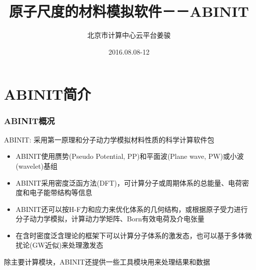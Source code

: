 \documentclass[cjk,slidestop,compress,mathserif,blue]{beamer}
\begin{document}

\title{原子尺度的材料模拟软件－－ABINIT}

\author{北京市计算中心\;云平台\:姜骏}
\date{\textrm{2016.08.08-12}}
\frame{\titlepage}

\section*{}

\small
\section{ABINIT简介}
\frame
{
\frametitle{ABINIT概况}
\textrm{ABINIT}: 采用第一原理和分子动力学模拟材料性质的科学计算软件包
\begin{itemize}
	\item \textrm{ABINIT}使用赝势\textrm{(Pseudo Potential, PP)}和平面波\textrm{(Plane wave, PW)}或小波\textrm{(wavelet)}基组
	\item \textrm{ABINIT}采用密度泛函方法\textrm{(DFT)}，可计算分子或周期体系的总能量、电荷密度和电子能带结构等信息
	\item \textrm{ABINIT}还可以按\textrm{H-F}力和应力来优化体系的几何结构，或根据原子受力进行分子动力学模拟，计算动力学矩阵、\textrm{Born}有效电荷及介电张量
	\item 在含时密度泛含理论的框架下可以计算分子体系的激发态，也可以基于多体微扰论(\textrm{GW}近似)来处理激发态
\end{itemize}
除主要计算模块，\textrm{ABINIT}还提供一些工具模块用来处理结果和数据
}
\end{document}
